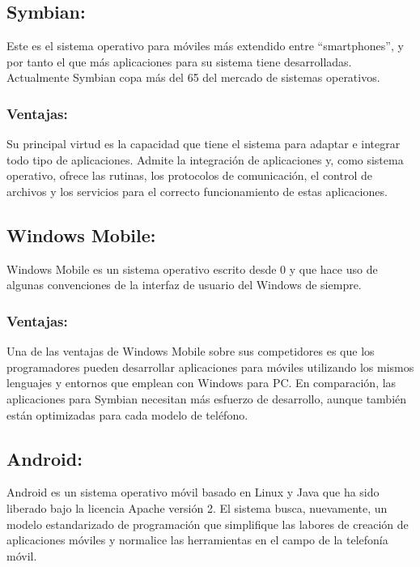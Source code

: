 \documentclass{bmcart}
\begin{document}
\subsection*{Symbian:}

Este es el sistema operativo para móviles más extendido entre “smartphones”, y por
tanto el que más aplicaciones para su sistema tiene desarrolladas. Actualmente
Symbian copa más del 65 del mercado de sistemas operativos.\cite{del2009sistemas}

\subsubsection*{Ventajas:}

Su principal virtud es la capacidad que tiene el sistema para adaptar e integrar todo
tipo de aplicaciones. Admite la integración de aplicaciones y, como sistema operativo,
ofrece las rutinas, los protocolos de comunicación, el control de archivos y los
servicios para el correcto funcionamiento de estas aplicaciones.

\subsection*{Windows Mobile:}

Windows Mobile es un sistema operativo escrito desde 0 y que hace uso de
algunas convenciones de la interfaz de usuario del Windows de siempre.\cite{del2009sistemas}

\subsubsection*{Ventajas:}

Una de las ventajas de Windows Mobile sobre sus competidores es que los
programadores pueden desarrollar aplicaciones para móviles utilizando los mismos
lenguajes y entornos que emplean con Windows para PC. En comparación, las
aplicaciones para Symbian necesitan más esfuerzo de desarrollo, aunque también
están optimizadas para cada modelo de teléfono.


\subsection*{Android:}

Android es un sistema operativo móvil basado en Linux y Java que ha sido
liberado bajo la licencia Apache versión 2.
El sistema busca, nuevamente, un modelo estandarizado de programación que
simplifique las labores de creación de aplicaciones móviles y normalice las
herramientas en el campo de la telefonía móvil.\cite{del2009sistemas}\cite{polanco2011android}
\end{document}
